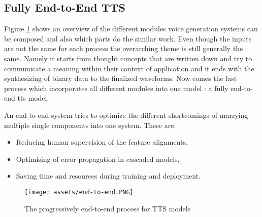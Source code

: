 \subsection{Fully End-to-End TTS}

Figure \ref{fig:end-to-end} shows an overview of the different modules voice generation systems can be composed and also which parts do the similar work. Even though the inputs are not the same for each process the overarching theme is still generally the same. Namely it starts from thought concepts that are written down and try to communicate a meaning within their context of application and it ends with the synthesizing of binary data to the finalized waveforms.
Now comes the last process which incorporates all different modules into one model : a fully end-to-end \gls{tts} model.

An end-to-end system tries to optimize the different shortcomings of marrying multiple single components into one system. These are:
\begin{itemize}
    \item Reducing human supervision of the feature alignments,
    \item Optimising of error propagation in cascaded models,
    \item Saving time and resources during training and deployment.
\end{itemize}
\cite{Tan2023fullyendtoend}

 \begin{figure}[H]
    \centering
    \texttt{[image: assets/end-to-end.PNG]}
    \caption{The progressively end-to-end process for TTS models\cite{Tan2023fullyendtoend}}
    \label{fig:end-to-end}
\end{figure}

